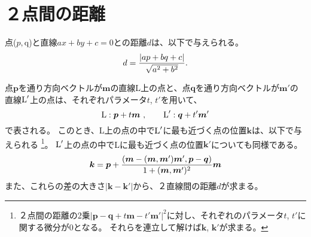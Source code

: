 




\section{２点間の距離}
\begin{tcolorbox}
点($p, $q)と直線$ax+by+c=0$との距離$d$は、以下で与えられる。
\begin{equation}
  \notag
  d = \frac{|ap+bq+c|}{\sqrt{a^2+b^2}}.
\end{equation}
\end{tcolorbox}
\begin{tcolorbox}
点$\boldsymbol p$を通り方向ベクトルが$\boldsymbol m$の直線L上の点と、点$\boldsymbol q$を通り方向ベクトルが$\boldsymbol m'$の直線$\text L'$上の点は、それぞれパラメータ$t$, $t'$を用いて、
\begin{equation}
  \notag
  \text L: \boldsymbol p+t\boldsymbol m\ , \qquad
  \text L': \boldsymbol q+t'\boldsymbol m'
\end{equation}
で表される。
このとき、L上の点の中で$\text L'$に最も近づく点の位置$\boldsymbol k$は、以下で与えられる
\footnote{２点間の距離の2乗$|\boldsymbol p-\boldsymbol q+t\boldsymbol m-t'\boldsymbol m'|^2$に対し、それぞれのパラメータ$t$, $t'$に関する微分が0となる。
それらを連立して解けば$\boldsymbol k$, $\boldsymbol k'$が求まる。}。
$\text L'$上の点の中でLに最も近づく点の位置$\boldsymbol k'$についても同様である。
\begin{equation}
  \notag
  \boldsymbol k
  = \boldsymbol p
    +\frac{(\boldsymbol m-(\boldsymbol m, \boldsymbol m')\boldsymbol m', \boldsymbol p-\boldsymbol q)}
          {1+(\boldsymbol m, \boldsymbol m')^2}\boldsymbol m
\end{equation}
また、これらの差の大きさ$|\boldsymbol k-\boldsymbol k'|$から、２直線間の距離$d$が求まる。
\end{tcolorbox}
